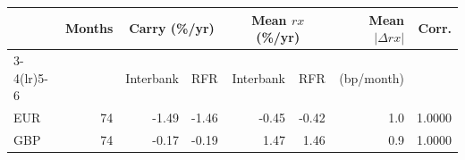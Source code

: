 \begin{tabular}{@{}lrrrrrrr@{}}
\toprule
 & Months & \multicolumn{2}{c}{Carry (\%/yr)} & \multicolumn{2}{c}{Mean $rx$ (\%/yr)} & Mean $|\Delta rx|$ & Corr. \\
\cmidrule(lr){3-4}\cmidrule(lr){5-6}
 & & Interbank & RFR & Interbank & RFR & (bp/month) & \\
\midrule
EUR & 74 & -1.49 & -1.46 & -0.45 & -0.42 & 1.0 & 1.0000 \\
GBP & 74 & -0.17 & -0.19 & 1.47 & 1.46 & 0.9 & 1.0000 \\
\bottomrule
\end{tabular}

